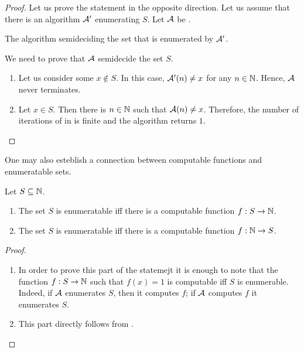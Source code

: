 \begin{proof}
  Let us prove the statement in the opposite direction. Let us assume that
  there is an algorithm $\mathcal{A}'$ enumerating $S$. Let $\mathcal{A}$
  be .
  \begin{algorithm}
      \begin{algorithmic}[1]
              \label{line:while-semideciding-from-enumerating}
              \EndWhile
          \EndFunction
      \end{algorithmic}
      \caption{The algorithm semideciding the set that is enumerated by
        $\mathcal{A}'$.}
      \label{algorithm:semideciding-from-enumerating}
  \end{algorithm}
  We need to prove that $\mathcal{A}$ semidecide the set $S$.
  \begin{enumerate}
    \item Let us consider some $x \notin S$. In this case,
      $\mathcal{A}'(n) \neq x$ for any $n \in \mathbb{N}$. Hence, $\mathcal{A}$
      never terminates.
    \item Let $x \in S$. Then there is $n \in \mathbb{N}$ such that
      $\mathcal{A}(n) \neq x$.
      Therefore, the number of iterations of
       in
       is finite and the
      algorithm returns $1$.
  \end{enumerate}
\end{proof}

One may also esteblish a connection between computable functions and
enumeratable sets.
\begin{theorem}
  Let $S \subseteq \mathbb{N}$.
  \begin{enumerate}
    \item The set $S$ is enumeratable iff there is a computable function
      $f : S \to \mathbb{N}$.
    \item The set $S$ is enumeratable iff there is a computable function
      $f : \mathbb{N} \to S$.
  \end{enumerate}
\end{theorem}
\begin{proof}
  \begin{enumerate}
    \item In order to prove this part of the statemejt it is enough to note that
      the function $f : S \to \mathbb{N}$ such that $f(x) = 1$ is computable iff
      $S$ is enumerable. Indeed, if $\mathcal{A}$ enumerates $S$, then
      it computes $f$; if $\mathcal{A}$ computes $f$ it enumerates $S$.
    \item This part directly follows from
      .
  \end{enumerate}
\end{proof}


